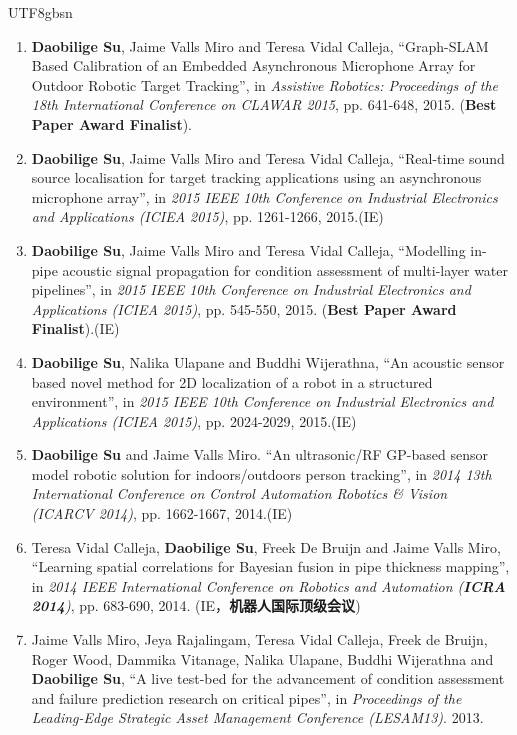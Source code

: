 \documentclass[margin,line]{res}
\begin{document}
\begin{CJK*}{UTF8}{gbsn}
\begin{resume}
\begin{enumerate}
\item {\bf Daobilige Su}, Jaime Valls Miro and Teresa Vidal Calleja, ``Graph-SLAM Based Calibration of an Embedded Asynchronous Microphone Array for Outdoor Robotic Target Tracking'', in {\it Assistive Robotics: Proceedings of the 18th International Conference on CLAWAR 2015}, pp. 641-648, 2015. ({\bf Best Paper Award Finalist}).

\item {\bf Daobilige Su}, Jaime Valls Miro and Teresa Vidal Calleja, ``Real-time sound source localisation for target tracking applications using an asynchronous microphone array'', in {\it 2015 IEEE 10th Conference on Industrial Electronics and Applications (ICIEA 2015)}, pp. 1261-1266, 2015.(IE)

\item {\bf Daobilige Su}, Jaime Valls Miro and Teresa Vidal Calleja, ``Modelling in-pipe acoustic signal propagation for condition assessment of multi-layer water pipelines'', in {\it 2015 IEEE 10th Conference on Industrial Electronics and Applications (ICIEA 2015)}, pp. 545-550, 2015. ({\bf Best Paper Award Finalist}).(IE)

\item {\bf Daobilige Su}, Nalika Ulapane and Buddhi Wijerathna, ``An acoustic sensor based novel method for 2D localization of a robot in a structured environment'', in {\it 2015 IEEE 10th Conference on Industrial Electronics and Applications (ICIEA 2015)}, pp. 2024-2029, 2015.(IE)

\item {\bf Daobilige Su} and Jaime Valls Miro. ``An ultrasonic/RF GP-based sensor model robotic solution for indoors/outdoors person tracking'', in {\it 2014 13th International Conference on Control Automation Robotics \& Vision (ICARCV 2014)}, pp. 1662-1667, 2014.(IE)

\item Teresa Vidal Calleja, {\bf Daobilige Su}, Freek De Bruijn and Jaime Valls Miro, ``Learning spatial correlations for Bayesian fusion in pipe thickness mapping'', in {\it 2014 IEEE International Conference on Robotics and Automation (\textbf{ICRA 2014})}, pp. 683-690, 2014. (IE，\textbf{机器人国际顶级会议})

\item Jaime Valls Miro, Jeya Rajalingam, Teresa Vidal Calleja, Freek de Bruijn, Roger Wood, Dammika Vitanage, Nalika Ulapane, Buddhi Wijerathna and {\bf Daobilige Su}, ``A live test-bed for the advancement of condition assessment and failure prediction research on critical pipes'', in {\it Proceedings of the Leading-Edge Strategic Asset Management Conference (LESAM13)}. 2013.


\end{enumerate}
\end{resume}
\end{CJK*}
\end{document}
